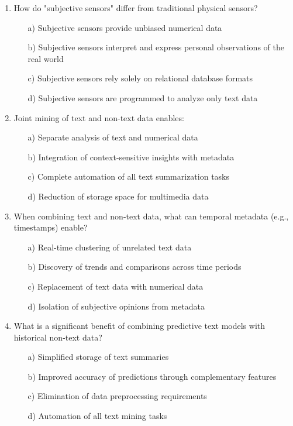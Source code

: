 \documentclass[8pt]{extarticle}
\begin{document}
\begin{multicols}{2}
\begin{enumerate}
\item How do "subjective sensors" differ from traditional physical sensors?
\begin{itemize}
\item[a)] Subjective sensors provide unbiased numerical data
\item[b)] Subjective sensors interpret and express personal observations of the real world
\item[c)] Subjective sensors rely solely on relational database formats
\item[d)] Subjective sensors are programmed to analyze only text data
\end{itemize}

\item Joint mining of text and non-text data enables:
\begin{itemize}
\item[a)] Separate analysis of text and numerical data
\item[b)] Integration of context-sensitive insights with metadata
\item[c)] Complete automation of all text summarization tasks
\item[d)] Reduction of storage space for multimedia data
\end{itemize}

\item When combining text and non-text data, what can temporal metadata (e.g., timestamps) enable?
\begin{itemize}
\item[a)] Real-time clustering of unrelated text data
\item[b)] Discovery of trends and comparisons across time periods
\item[c)] Replacement of text data with numerical data
\item[d)] Isolation of subjective opinions from metadata
\end{itemize}

\item What is a significant benefit of combining predictive text models with historical non-text data?
\begin{itemize}
\item[a)] Simplified storage of text summaries
\item[b)] Improved accuracy of predictions through complementary features
\item[c)] Elimination of data preprocessing requirements
\item[d)] Automation of all text mining tasks
\end{itemize}


\end{enumerate}
\end{multicols}
\end{document}
